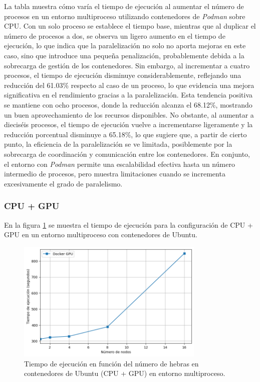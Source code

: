 La tabla muestra cómo varía el tiempo de ejecución al aumentar el número de procesos en un entorno multiproceso utilizando contenedores de \textit{Podman} sobre CPU. Con un solo proceso se establece el tiempo base, mientras que al duplicar el número de procesos a dos, se observa un ligero aumento en el tiempo de ejecución, lo que indica que la paralelización no solo no aporta mejoras en este caso, sino que introduce una pequeña penalización, probablemente debida a la sobrecarga de gestión de los contenedores. Sin embargo, al incrementar a cuatro procesos, el tiempo de ejecución disminuye considerablemente, reflejando una reducción del 61.03\% respecto al caso de un proceso, lo que evidencia una mejora significativa en el rendimiento gracias a la paralelización. Esta tendencia positiva se mantiene con ocho procesos, donde la reducción alcanza el 68.12\%, mostrando un buen aprovechamiento de los recursos disponibles. No obstante, al aumentar a dieciséis procesos, el tiempo de ejecución vuelve a incrementarse ligeramente y la reducción porcentual disminuye a 65.18\%, lo que sugiere que, a partir de cierto punto, la eficiencia de la paralelización se ve limitada, posiblemente por la sobrecarga de coordinación y comunicación entre los contenedores. En conjunto, el entorno con \textit{Podman} permite una escalabilidad efectiva hasta un número intermedio de procesos, pero muestra limitaciones cuando se incrementa excesivamente el grado de paralelismo.

\subsubsection{CPU + GPU}

En la figura \ref{fig:multi-node_ubuntu_docker_gpu_time} se muestra el tiempo de ejecución para la configuración de CPU + GPU en un entorno multiproceso con contenedores de Ubuntu.

\begin{figure}[ht]
    \centering
    \includegraphics[width=0.8\textwidth]{imagenes/cap5/multi-node_ubuntu_docker_gpu_time.png}
    \caption{Tiempo de ejecución en función del número de hebras en contenedores de Ubuntu (CPU + GPU) en entorno multiproceso.}
    \label{fig:multi-node_ubuntu_docker_gpu_time}
\end{figure}

